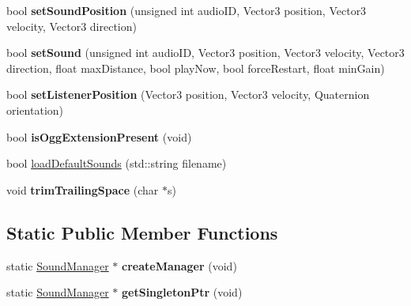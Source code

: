 \begin{DoxyCompactItemize}
\item 
\hypertarget{class_sound_manager_a21b37c2f591620e09cce87773fb21d32}{bool {\bfseries set\-Sound\-Position} (unsigned int audio\-I\-D, Vector3 position, Vector3 velocity, Vector3 direction)}\label{class_sound_manager_a21b37c2f591620e09cce87773fb21d32}

\item 
\hypertarget{class_sound_manager_a5072e2bd61b53cfa7a138120a5ea7404}{bool {\bfseries set\-Sound} (unsigned int audio\-I\-D, Vector3 position, Vector3 velocity, Vector3 direction, float max\-Distance, bool play\-Now, bool force\-Restart, float min\-Gain)}\label{class_sound_manager_a5072e2bd61b53cfa7a138120a5ea7404}

\item 
\hypertarget{class_sound_manager_a0ad7051e7bb37943ebdeda2d55c43798}{bool {\bfseries set\-Listener\-Position} (Vector3 position, Vector3 velocity, Quaternion orientation)}\label{class_sound_manager_a0ad7051e7bb37943ebdeda2d55c43798}

\item 
\hypertarget{class_sound_manager_a6dd06b089f7540c57d1d3a46fa843f90}{bool {\bfseries is\-Ogg\-Extension\-Present} (void)}\label{class_sound_manager_a6dd06b089f7540c57d1d3a46fa843f90}

\item 
bool \hyperlink{class_sound_manager_ae84fd5609aea7d7eef8fb92442ea92f1}{load\-Default\-Sounds} (std\-::string filename)
\item 
\hypertarget{class_sound_manager_a122cf811c2e3437585f440fb9d50da71}{void {\bfseries trim\-Trailing\-Space} (char $\ast$s)}\label{class_sound_manager_a122cf811c2e3437585f440fb9d50da71}

\end{DoxyCompactItemize}
\subsection*{Static Public Member Functions}
\begin{DoxyCompactItemize}
\item 
\hypertarget{class_sound_manager_a6ca92970a4f8c3321ddbbcc8b574654d}{static \hyperlink{class_sound_manager}{Sound\-Manager} $\ast$ {\bfseries create\-Manager} (void)}\label{class_sound_manager_a6ca92970a4f8c3321ddbbcc8b574654d}

\item 
\hypertarget{class_sound_manager_a1ff554c0e8add31b81dbc2fb6c77ed17}{static \hyperlink{class_sound_manager}{Sound\-Manager} $\ast$ {\bfseries get\-Singleton\-Ptr} (void)}\label{class_sound_manager_a1ff554c0e8add31b81dbc2fb6c77ed17}

\end{DoxyCompactItemize}
